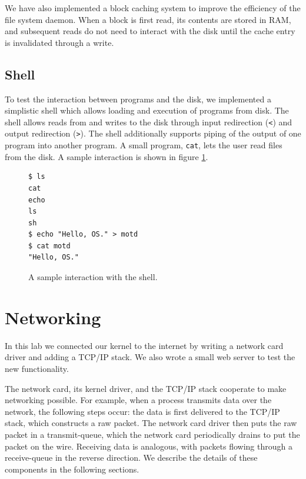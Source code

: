 \documentclass{report}
\begin{document}
We have also implemented a block caching system to improve the efficiency of
the file system daemon. When a block is first read, its contents are stored in
RAM, and subsequent reads do not need to interact with the disk until the
cache entry is invalidated through a write.


\section{Shell}
\label{sec:shell}
To test the interaction between programs and the disk, we implemented a
simplistic shell which allows loading and execution of programs from disk. The
shell allows reads from and writes to the disk through input redirection
(\texttt{<}) and output redirection (\texttt{>}). The shell additionally
supports piping of the output of one program into another program. A small
program, \texttt{cat}, lets the user read files from the disk. A sample interaction
is shown in figure \ref{fig:shellinteraction}.

\begin{figure}[h]
\begin{framed}
\begin{Verbatim}[fontsize=\small]
$ ls
cat
echo
ls
sh
$ echo "Hello, OS." > motd
$ cat motd
"Hello, OS." 
\end{Verbatim}
\end{framed}
\caption{A sample interaction with the shell.}
\label{fig:shellinteraction}
\end{figure}



\chapter{Networking}
In this lab we connected our kernel to the internet by writing a network card
driver and adding a TCP/IP stack. We also wrote a small web server to test the
new functionality.

The network card, its kernel driver, and the TCP/IP stack cooperate to make
networking possible. For example, when a process transmits data over the
network, the following steps occur: the data is first delivered to the
TCP/IP stack, which constructs a raw packet. The network card driver then puts
the raw packet in a transmit-queue, which the network card periodically
drains to put the packet on the wire. Receiving data is analogous, with
packets flowing through a receive-queue in the reverse direction. We describe
the details of these components in the following sections.
\end{document}
